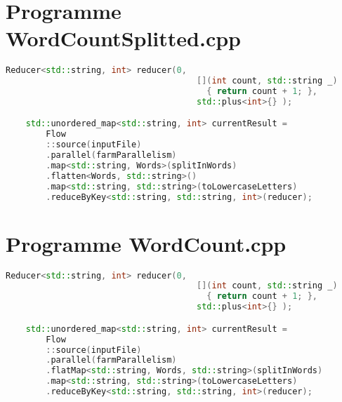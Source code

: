 \newpage
\section{Programme {WordCountSplitted.cpp}}
\label{appendice-code-wordcount-s.ann}
\begin{lstlisting}[gobble=4,basicstyle=\ttfamily\footnotesize,language=c++]
    Reducer<std::string, int> reducer(0, 
                                      [](int count, std::string _)
                                        { return count + 1; },
                                      std::plus<int>{} );

    std::unordered_map<std::string, int> currentResult = 
        Flow
        ::source(inputFile)
        .parallel(farmParallelism)
        .map<std::string, Words>(splitInWords)			
        .flatten<Words, std::string>()			
        .map<std::string, std::string>(toLowercaseLetters)			
        .reduceByKey<std::string, std::string, int>(reducer);  
\end{lstlisting}

\newpage
\section{Programme {WordCount.cpp}}
\begin{lstlisting}[gobble=4,basicstyle=\ttfamily\footnotesize,language=c++]
    Reducer<std::string, int> reducer(0, 
                                      [](int count, std::string _)
                                        { return count + 1; },
                                      std::plus<int>{} );

    std::unordered_map<std::string, int> currentResult = 
        Flow
        ::source(inputFile)
        .parallel(farmParallelism)
        .flatMap<std::string, Words, std::string>(splitInWords)			
        .map<std::string, std::string>(toLowercaseLetters)			
        .reduceByKey<std::string, std::string, int>(reducer);  
\end{lstlisting}

\newpage
